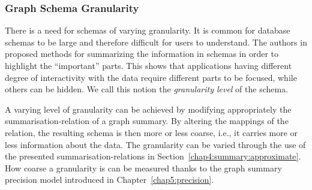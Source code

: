 \subsubsection{Graph Schema Granularity}

There is a need for schemas of varying granularity. It is common for database schemas to be large and therefore difficult for users to understand. The authors in \cite{yu:2006:schema-summarization,yang:2011:summary-graphs} proposed methods for summarizing the information in schemas in order to highlight the ``important'' parts. This shows that applications having different degree of interactivity with the data require different parts to be focused, while others can be hidden. We call this notion the \emph{granularity level} of the schema.

A varying level of granularity can be achieved by modifying appropriately the \gls{summarisation-relation} of a graph summary. By altering the mappings of the relation, the resulting schema is then more or less coarse, i.e., it carries more or less information about the data. The granularity can be varied through the use of the presented \glspl{summarisation-relation} in Section~\ref{chap4:summary:approximate}. How coarse a granularity is can be measured thanks to the graph summary precision model introduced in Chapter~\ref{chap5:precision}.


